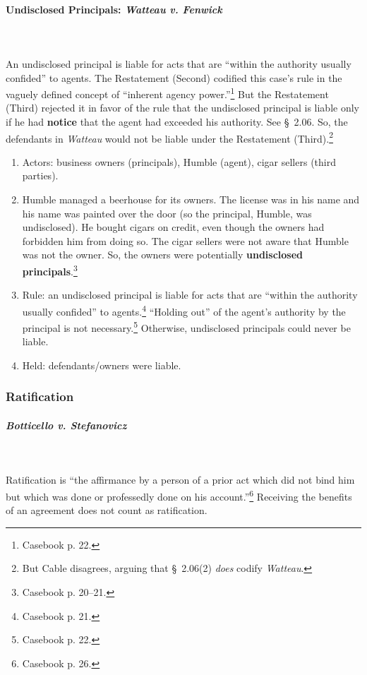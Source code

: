 \paragraph{Undisclosed Principals: \emph{Watteau v. Fenwick}}
\label{par:watteau}
~\\\\
An undisclosed principal is liable for acts that are ``within the authority 
usually confided'' to agents.  The Restatement (Second) codified this case's 
rule in the vaguely defined concept of ``inherent agency 
power.''\footnote{Casebook p. 22.} But the Restatement (Third) rejected it in 
favor of the rule that the undisclosed principal is liable only if he had 
\textbf{notice} that the agent had exceeded his authority. See \S\ 2.06. So, 
the defendants in \emph{Watteau} would not be liable under the Restatement 
(Third).\footnote{But Cable disagrees, arguing that \S\ 2.06(2) \emph{does} 
codify \emph{Watteau}.}

\begin{enumerate}
    \item Actors: business owners (principals), Humble (agent), cigar sellers 
    (third parties).
    \item Humble managed a beerhouse for its owners. The license was in his 
    name and his name was painted over the door (so the principal, Humble, was 
    undisclosed). He bought cigars on credit, even though the owners had 
    forbidden him from doing so. The cigar sellers were not aware that Humble 
    was not the owner. So, the owners were potentially \textbf{undisclosed 
    principals}.\footnote{Casebook p. 20--21.}
    \item Rule: an undisclosed principal is liable for acts that are ``within 
    the authority usually confided'' to agents.\footnote{Casebook p. 21.} 
    ``Holding out'' of the agent's authority by the principal is not 
    necessary.\footnote{Casebook p. 22.} Otherwise, undisclosed principals 
    could never be liable.
    \item Held: defendants/owners were liable.
\end{enumerate}

\subsubsection{Ratification}

\paragraph{\emph{Botticello v. Stefanovicz}}
\label{par:botticello}
~\\\\
Ratification is ``the affirmance by a person of a prior act which did not bind 
him but which was done or professedly done on his account.''\footnote{Casebook 
p. 26.} Receiving the benefits of an agreement does not count as ratification.

